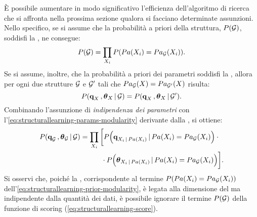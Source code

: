 \`E possibile aumentare in modo significativo l'efficienza dell'algoritmo di ricerca che si affronta nella prossima sezione qualora si facciano determinate assunzioni. Nello specifico, se si assume che la probabilità a priori della struttura, $P(\mathcal{G})$, soddisfi la \emph{}, ne consegue:
\begin{equation}\label{eq:structurallearning-prior-modularity}
P(\mathcal{G})=\prod_{\mathnormal{X}_i} P(Pa(\mathnormal{X}_i) = Pa_{\mathcal{G}}(\mathnormal{X}_i))\text{.}
\end{equation}
Se si assume, inoltre, che la probabilità a priori dei parametri soddisfi la \emph{}, allora per ogni due strutture $\mathcal{G}$ e $\mathcal{G}^\prime$ tali che $Pa_{\mathcal{G}}(\mathnormal{X}) = Pa_{\mathcal{G}^\prime}(\mathnormal{X})$ risulta:
\begin{equation}\label{eq:structurallearning-params-modularity}
P(\boldsymbol{\textbf{\text{q}}}_{\mathnormal{X}}\,,\boldsymbol{\textbf{\text{$\theta$}}}_{\mathnormal{X}}\,\arrowvert\,\mathcal{G}) = P(\boldsymbol{\textbf{\text{q}}}_{\mathnormal{X}}\,,\boldsymbol{\textbf{\text{$\theta$}}}_{\mathnormal{X}}\,\arrowvert\,\mathcal{G}^\prime)\text{.}
\end{equation}
Combinando l'assunzione di \emph{indipendenza dei parametri} con l'\autoref{eq:structurallearning-params-modularity} derivante dalla \emph{}, si ottiene:
\begin{align}\label{eq:structurallearning-params-posterior}
P(\boldsymbol{\textbf{\text{q}}}_{\mathcal{G}}\,,\boldsymbol{\textbf{\text{$\theta$}}}_{\mathcal{G}}\,\arrowvert\,\mathcal{G}) &= \prod_{\mathnormal{X}_i} \bigg[ P\Big(\boldsymbol{\textbf{\text{q}}}_{\mathnormal{X}_i\,\arrowvert\,Pa(\mathnormal{X}_i)}\,\arrowvert\,Pa(\mathnormal{X}_i)=Pa_{\mathcal{G}}(\mathnormal{X}_i)\Big) \cdot \bigg.\nonumber\\
& \quad \bigg.{} \qquad \cdot P\Big(\boldsymbol{\textbf{\text{$\theta$}}}_{\mathnormal{X}_i\,\arrowvert\,Pa(\mathnormal{X}_i)}\,\arrowvert\,Pa(\mathnormal{X}_i)=Pa_{\mathcal{G}}(\mathnormal{X}_i)\Big) \bigg]\text{.}
\end{align}
Si osservi che, poiché la \emph{}, corrispondente al termine $P(Pa(\mathnormal{X}_i) = Pa_{\mathcal{G}}(\mathnormal{X}_i))$ dell'\autoref{eq:structurallearning-prior-modularity}, è legata alla dimensione del  ma indipendente dalla quantità dei dati, è possibile ignorare il termine $P(\mathcal{G})$ della funzione di scoring (\autoref{eq:structurallearning-score}).

